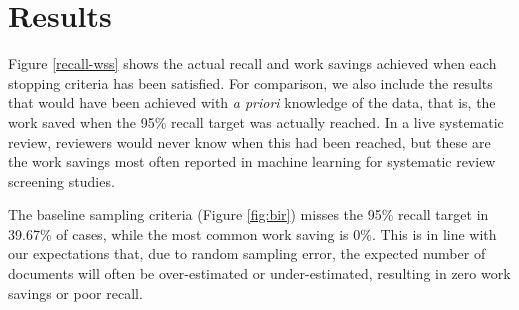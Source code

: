 \documentclass{bmcart}
\begin{document}
	
	\section*{Results}
	
	Figure \ref{recall-wss} shows the actual recall and work savings achieved when each stopping criteria has been satisfied. 
	For comparison, we also include the results that would have been achieved with \textit{a priori} knowledge of the data, that is, the work saved when the 95\% recall target was actually reached. In a live systematic review, reviewers would never know when this had been reached, but these are the work savings most often reported in machine learning for systematic review screening studies.
		
	The baseline sampling criteria (Figure \ref{fig:bir}) misses the 95\% recall target in 39.67\% of cases, while the most common work saving is 0\%. This is in line with our expectations that, due to random sampling error, the expected number of documents will often be over-estimated or under-estimated, resulting in zero work savings or poor recall.
\end{document}
